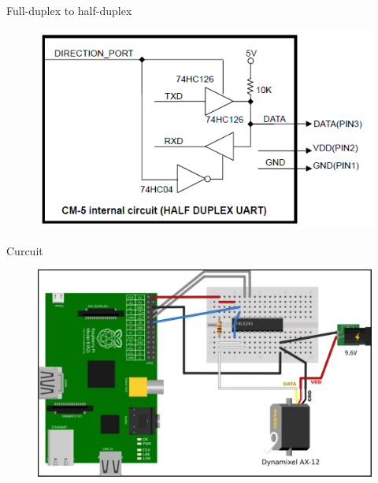\documentclass{beamer}
\begin{document}
\begin{frame}{Full-duplex to half-duplex }

    \begin{figure}
        \centering
        \includegraphics[width = \textwidth]{img/ttl_circuit.png}
        
    \end{figure}
    
\end{frame}



\begin{frame}{Curcuit}

    \begin{figure}
        \centering
        \includegraphics[width = \textwidth]{img/curcuit.jpg}
        
    \end{figure}
    
\end{frame}
\end{document}
